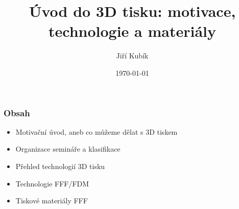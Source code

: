 \documentclass[aspectratio=169]{beamer}
\author{Jiří Kubík}
\title{Úvod do 3D tisku: motivace, technologie a materiály}
\date{\today}
\institute{%
\vspace{0.25em}
   {\bf \ps}\\ 
\vspace{0.25em}
   {\bf 2022}\\ 
\vspace{0.25em}
   {\GyBot}\\
\vspace{0.25em}
   {rev. 2022-10-1}
}
\begin{document}
    \begin{frame}
        \titlepage
    \end{frame}

    \begin{frame}[t]
        \frametitle{Obsah}
        \begin{itemize}
            \item Motivační úvod, aneb co můžeme dělat s 3D tiskem
            \item Organizace semináře a klasifikace
            \item Přehled technologií 3D tisku
            \item Technologie FFF/FDM
            \item Tiskové materiály FFF
        \end{itemize}
    \end{frame}

    
    
    
    
    
    
    
\end{document}
